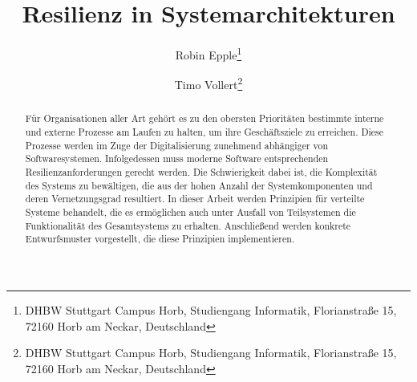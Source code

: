 \documentclass[]{lni}
\begin{document}
\title[Resilienz in Systemarchitekturen]{Resilienz in Systemarchitekturen}

\author[Robin Epple \and Timo Vollert]
{Robin Epple\footnote{DHBW Stuttgart Campus Horb, Studiengang Informatik, Florianstraße 15, 72160 Horb am Neckar,
Deutschland } \and
Timo Vollert\footnote{DHBW Stuttgart Campus Horb, Studiengang Informatik, Florianstraße 15, 72160 Horb am Neckar,
Deutschland }}


\maketitle


\begin{abstract}
Für Organisationen aller Art gehört es zu den obersten Prioritäten bestimmte interne und externe Prozesse am Laufen zu halten, um ihre Geschäftsziele zu erreichen. 
Diese Prozesse werden im Zuge der Digitalisierung zunehmend abhängiger von Softwaresystemen. Infolgedessen muss moderne Software entsprechenden Resilienzanforderungen gerecht werden.
Die Schwierigkeit dabei ist, die Komplexität des Systems zu bewältigen, die aus der hohen Anzahl der Systemkomponenten und deren Vernetzungsgrad resultiert.
In dieser Arbeit werden Prinzipien für verteilte Systeme behandelt, die es ermöglichen auch unter Ausfall von Teilsystemen die Funktionalität des Gesamtsystems zu erhalten.
Anschließend werden konkrete Entwurfsmuster vorgestellt, die diese Prinzipien implementieren.
\end{abstract}

\end{document}
